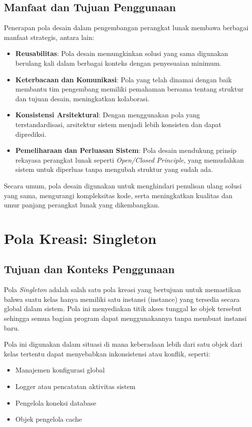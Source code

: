 \subsection{Manfaat dan Tujuan Penggunaan}
Penerapan pola desain dalam pengembangan perangkat lunak membawa berbagai manfaat strategis, antara lain:
\begin{itemize}
	\item \textbf{Reusabilitas}: Pola desain memungkinkan solusi yang sama digunakan berulang kali dalam berbagai konteks dengan penyesuaian minimum.
	\item \textbf{Keterbacaan dan Komunikasi}: Pola yang telah dinamai dengan baik membantu tim pengembang memiliki pemahaman bersama tentang struktur dan tujuan desain, meningkatkan kolaborasi.
	\item \textbf{Konsistensi Arsitektural}: Dengan menggunakan pola yang terstandardisasi, arsitektur sistem menjadi lebih konsisten dan dapat diprediksi.
	\item \textbf{Pemeliharaan dan Perluasan Sistem}: Pola desain mendukung prinsip rekayasa perangkat lunak seperti \textit{Open/Closed Principle}, yang memudahkan sistem untuk diperluas tanpa mengubah struktur yang sudah ada.
\end{itemize}
Secara umum, pola desain digunakan untuk menghindari penulisan ulang solusi yang sama, mengurangi kompleksitas kode, serta meningkatkan kualitas dan umur panjang perangkat lunak yang dikembangkan.


\section{Pola Kreasi: Singleton}

\subsection{Tujuan dan Konteks Penggunaan}
Pola \textit{Singleton} adalah salah satu pola kreasi yang bertujuan untuk memastikan bahwa suatu kelas hanya memiliki satu instansi (instance) yang tersedia secara global dalam sistem. Pola ini menyediakan titik akses tunggal ke objek tersebut sehingga semua bagian program dapat menggunakannya tanpa membuat instansi baru.

Pola ini digunakan dalam situasi di mana keberadaan lebih dari satu objek dari kelas tertentu dapat menyebabkan inkonsistensi atau konflik, seperti:
\begin{itemize}
	\item Manajemen konfigurasi global
	\item Logger atau pencatatan aktivitas sistem
	\item Pengelola koneksi database
	\item Objek pengelola cache
\end{itemize}

